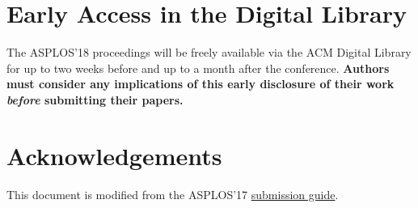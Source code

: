 \documentclass[pageno]{jpaper}
\begin{document}
%
%
%

\section{Early Access in the Digital Library}

The ASPLOS'18 proceedings will be freely available via the ACM Digital
Library for up to two weeks before and up to a month after the
conference. {\bf Authors must consider any implications of this early
disclosure of their work {\em before} submitting their papers.}


\section{Acknowledgements}

This document is modified from the ASPLOS'17 \href{http://novel.ict.ac.cn/ASPLOS2017/files/asplos17-template.pdf}{submission guide}.



\end{document}

